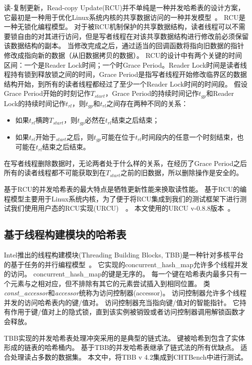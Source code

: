 读-复制更新，Read-copy Update(RCU)并不单纯是一种并发哈希表的设计方案，它最初是一种用于优化Linux系统内核的共享数据访问的一种并发模型~\cite{rcu}。
RCU是一种无锁化编程模型。
对于被RCU机制保护的共享数据结构，读者线程可以不需要锁自由的对其进行访问，但是写者线程在对该共享数据结构进行修改前必须保留该数据结构的副本。
当修改完成之后，通过适当的回调函数将指向旧数据的指针修改成指向新的数据（从旧数据拷贝的数据）。
RCU的设计中有两个关键的时间区间：一个是Reader Lock时间；一个时Grace Period。Reader Lock时间是读者线程持有锁到释放锁之间的时间，Grace Period是指写者线程开始修改临界区的数据结构开始，到所有的读者线程都经过了至少一个Reader Lock时间的时间段。
假设Grace Period开始的时刻记作$T_{start}$，Grace Period的持续时间记作$t_{gp}$和Reader Lock的持续时间记作$t_{rl}$，则$t_{gp}$和$t_{rl}$之间存在两种不同的关系：
\begin{itemize}
  \item 如果$t_{rl}$横跨$T_{start}$，则$t_{gp}$必然在$t_{rl}$结束之后结束；
  \item 如果$t_{rl}$开始于$_{start}$之后，则$t_{gp}$可能在位于$t_{rl}$时间段内的任意一个时刻结束，也可能在$t_{rl}$结束之后结束。
\end{itemize}
在写者线程删除数据时，无论两者处于什么样的关系，在经历了Grace Period之后所有的读者线程都不可能获取到在$T_{start}$之前的旧数据，所以删除操作是安全的。

基于RCU的并发哈希表的最大特点是牺牲更新性能来换取读性能。
基于RCU的编程模型主要用于Linux系统内核，为了便于将RCU集成到我们的测试框架下进行测试我们使用用户态的RCU实现(URCU)~\cite{urcu}~。
本文使用的URCU v-0.8.8版本~\cite{urcucode}。

\subsection{基于线程构建模块的哈希表}

Intel推出的线程构建模块(Threading Building Blocks, TBB)是一种针对多核平台的基于任务的并行编程模型~\cite{tbb}。
它实现的concurrent\_hash\_map允许多个线程并发的访问。
concurrent\_hash\_map的键是无序的。
每一个键在哈希表内最多只有一个元素与之相对应，但不排除有其它的元素尝试插入到相同位置。
类\textit{const\_accessor}和\textit{accessor}统称为访问控制器(accessor)。
访问控制器允许多个线程并发的访问哈希表内的键/值对。
访问控制器充当指向键/值对的智能指针。
它持有作用于键/值对上的隐式锁，直到该实例被销毁或者访问控制器调用解锁函数才会释放。

TBB实现的并发哈希表处理冲突采用的是典型的链式法。
键被哈希到包含了实体形成的链表的哈希桶内。
基于TBB的并发哈希表继承了链式法的所有优缺点。
适合处理读占多数的数据集。
本文中，将TBB v 4.2集成到CHTBench中进行测试。

